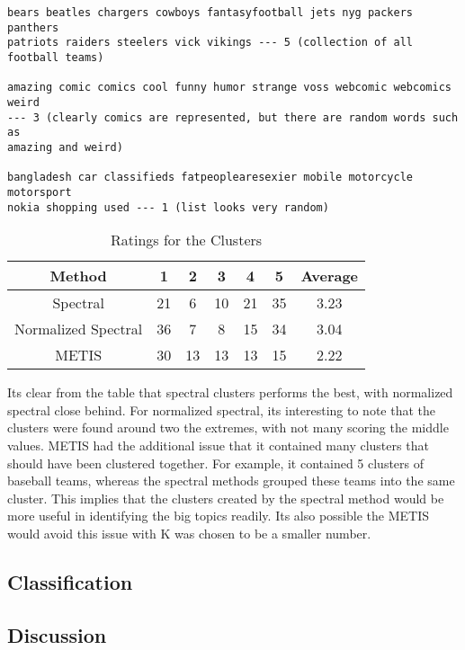\begin{verbatim} 
bears beatles chargers cowboys fantasyfootball jets nyg packers panthers 
patriots raiders steelers vick vikings --- 5 (collection of all football teams)

amazing comic comics cool funny humor strange voss webcomic webcomics weird 
--- 3 (clearly comics are represented, but there are random words such as 
amazing and weird)

bangladesh car classifieds fatpeoplearesexier mobile motorcycle motorsport 
nokia shopping used --- 1 (list looks very random)

\end{verbatim}


\begin{table}[ht]
\caption{Ratings for the Clusters}
\centering
\begin{tabular}{c c c c c c c}
\hline\hline
Method & 1 & 2 & 3 & 4 & 5 & Average \\ [0.5ex] %
\hline
Spectral & 21 & 6 & 10 & 21 & 35 & 3.23\\
\hline
Normalized Spectral & 36 & 7 & 8 & 15 & 34 & 3.04 \\
\hline
METIS & 30 & 13 & 13 & 13 & 15 & 2.22 \\[1ex]
\hline
\end{tabular}
\label{table:rating}
\end{table}


Its clear from the table that spectral clusters performs the best, with normalized spectral close behind. For normalized spectral, its interesting to note that the clusters were found around two the extremes, with not many scoring the middle values. METIS had the additional issue that it contained many clusters that should have been clustered together. For example, it contained 5 clusters of baseball teams, whereas the spectral methods grouped these teams into the same cluster. This implies that the clusters created by the spectral method would be more useful in identifying the big topics readily. Its also possible the METIS would avoid this issue with K was chosen to be a smaller number.

 

\subsection{Classification}

\subsection{Discussion}